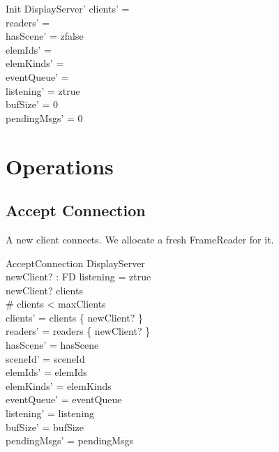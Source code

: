 \documentclass[a4paper,10pt,fleqn]{article}
\begin{document}
\begin{schema}{Init}
  DisplayServer'
  \where
  clients' = \emptyset \\
  readers' = \emptyset \\
  hasScene' = zfalse \\
  elemIds' = \emptyset \\
  elemKinds' = \emptyset \\
  eventQueue' = \emptyset \\
  listening' = ztrue \\
  bufSize' = 0 \\
  pendingMsgs' = 0
\end{schema}

\section{Operations}

\subsection{Accept Connection}

A new client connects.  We allocate a fresh FrameReader for it.

\begin{schema}{AcceptConnection}
  \Delta DisplayServer \\
  newClient? : FD
  \where
  listening = ztrue \\
  newClient? \notin clients \\
  \# clients < maxClients \\
  clients' = clients \cup \{ newClient? \} \\
  readers' = readers \cup \{ newClient? \} \\
  hasScene' = hasScene \\
  sceneId' = sceneId \\
  elemIds' = elemIds \\
  elemKinds' = elemKinds \\
  eventQueue' = eventQueue \\
  listening' = listening \\
  bufSize' = bufSize \\
  pendingMsgs' = pendingMsgs
\end{schema}
\end{document}
